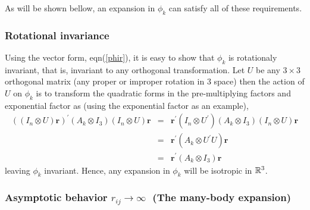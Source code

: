 \documentclass[12pt,thmsa]{article}
\begin{document}
\noindent As will be shown bellow, an expansion in $\phi _k$ can satisfy all
of these requirements.

\subsubsection{Rotational invariance}

Using the vector form, eqn(\ref{phir}), it is easy to show that $\phi _k$ is
rotationaly invariant, that is, invariant to any orthogonal transformation.
Let $U$ be any $3\times 3$ orthogonal matrix (any proper or improper
rotation in 3 space) then the action of $U$ on $\phi _k$ is to transform the
quadratic forms in the pre-multiplying factors and exponential factor as
(using the exponential factor as an example), 
\begin{eqnarray}
\left( \left( I_n\otimes U\right) \mathbf{r}\right) ^{\prime }(A_k\otimes
I_3)\left( I_n\otimes U\right) \mathbf{r} &=&\mathbf{r}^{\prime }\left(
I_n\otimes U^{\prime }\right) (A_k\otimes I_3)\left( I_n\otimes U\right) 
\mathbf{r} \\
&=&\mathbf{r}^{\prime }(A_k\otimes U^{\prime }U)\mathbf{r} \\
&=&\mathbf{r}^{\prime }(A_k\otimes I_3)\mathbf{r}
\end{eqnarray}
leaving $\phi _k$ invariant. Hence, any expansion in $\phi _k$ will be
isotropic in $\Bbb{R}^3$.

\subsubsection{Asymptotic behavior $r_{ij}\rightarrow \infty \,\,\,\,$(The
many-body expansion)}
\end{document}
